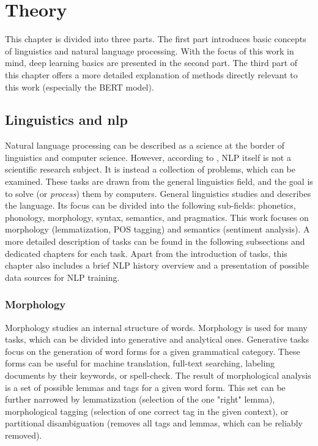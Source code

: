 \chapter{Theory}
\label{chap:theandme}
This chapter is divided into three parts. The first part introduces basic concepts of linguistics and natural language processing. With the focus of this work in mind, deep learning basics are presented in the second part. The third part of this chapter offers a more detailed explanation of methods directly relevant to this work (especially the BERT model).

\section{Linguistics and \gls{nlp}}
Natural language processing can be described as a science at the border of linguistics and computer science. However, according to \citep{Wilks}, NLP itself is not a scientific research subject. It is instead a collection of problems, which can be examined. These tasks are drawn from the general linguistics field, and the goal is to solve (or \textit{process}) them by computers. General linguistics studies and describes the language. Its focus can be divided into the following sub-fields: phonetics, phonology, morphology, syntax, semantics, and pragmatics. %
This work focuses on morphology (lemmatization, POS tagging) and semantics (sentiment analysis). A more detailed description of tasks can be found in the following subsections and dedicated chapters for each task. Apart from the introduction of tasks, this chapter also includes a brief NLP history overview and a presentation of possible data sources for NLP training.

\subsection{Morphology}
Morphology studies an internal structure of words. Morphology is used for many tasks, which can be divided into generative and analytical ones. Generative tasks focus on the generation of word forms for a given grammatical category. These forms can be useful for machine translation, full-text searching, labeling documents by their keywords, or spell-check. The result of morphological analysis is a set of possible lemmas and tags for a given word form. This set can be further narrowed by lemmatization (selection of the one "right" lemma), morphological tagging (selection of one correct tag in the given context), or partitional disambiguation (removes all tags and lemmas, which can be reliably removed).

